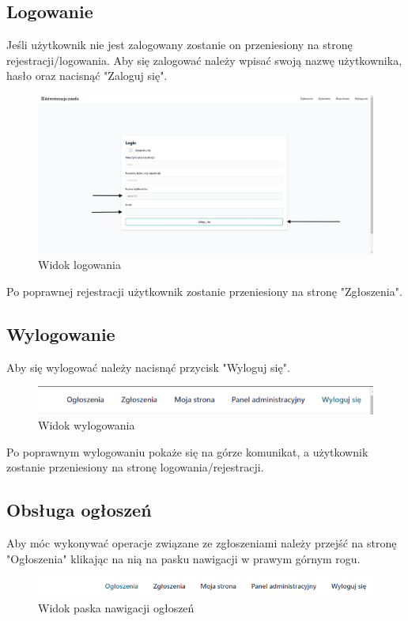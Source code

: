\subsection{Logowanie}
Jeśli użytkownik nie jest zalogowany zostanie on przeniesiony na stronę rejestracji/logowania. Aby się zalogować należy wpisać swoją nazwę użytkownika, hasło oraz nacisnąć "Zaloguj się".
\begin{figure}[H]
    \centering
    \includegraphics[width=1\linewidth]{img/instruction_login.png}
    \caption{Widok logowania}
    \label{fig:login_instruction}
\end{figure}
Po poprawnej rejestracji użytkownik zostanie przeniesiony na stronę "Zgłoszenia".
\subsection{Wylogowanie}
Aby się wylogować należy nacisnąć przycisk "Wyloguj się".
\begin{figure}[H]
    \centering
    \includegraphics[width=0.75\linewidth]{img/logout_button.png}
    \caption{Widok wylogowania}
    \label{fig:logout_button}
\end{figure}
Po poprawnym wylogowaniu pokaże się na górze komunikat, a użytkownik zostanie przeniesiony na stronę logowania/rejestracji.
\subsection{Obsługa ogłoszeń}
Aby móc wykonywać operacje związane ze zgłoszeniami należy przejść na stronę "Ogłoszenia" klikając na nią na pasku nawigacji w prawym górnym rogu.
\begin{figure}[H]
    \centering
    \includegraphics[width=0.75\linewidth]{img/navi_posts.png}
    \caption{Widok paska nawigacji ogłoszeń}
    \label{fig:navi-posts}
\end{figure}
